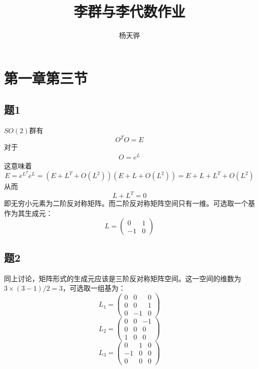 \documentclass{ctexart}
\title{李群与李代数作业}
\author{杨天骅}
\begin{document}
	\maketitle
	\tableofcontents
	
	\newpage
	
	\section{第一章第三节}
	
	\subsection{题1}
	
	$SO(2)$群有
	\begin{equation}
	O^TO=E
	\end{equation}
	对于
	\begin{eqnarray}
	O=e^{L}
	\end{eqnarray}
	这意味着
	\begin{equation}
	E=e^{L^T}e^{L}=(E+L^T+O(L^2))(E+L+O(L^2))=E+L+L^T+O(L^2)
	\end{equation}
	从而
	\begin{equation}
	L+L^T=0
	\end{equation}
	即无穷小元素为二阶反对称矩阵。而二阶反对称矩阵空间只有一维。可选取一个基作为其生成元：
	\begin{equation}
	L=\begin{pmatrix} 0 & 1 \\ -1 & 0 \end{pmatrix}
	\end{equation}
	
	\subsection{题2}
	
	同上讨论，矩阵形式的生成元应该是三阶反对称矩阵空间。这一空间的维数为$3\times (3-1)/2=3$，可选取一组基为：
	\begin{equation}
	L_1=\begin{pmatrix} 0 & 0 & 0 \\ 0 & 0 & 1 \\ 0 & -1 & 0 \end{pmatrix}
	\end{equation}
	\begin{equation}
	L_2=\begin{pmatrix} 0 & 0 & -1 \\ 0 & 0 & 0 \\ 1 & 0 & 0 \end{pmatrix}
	\end{equation}
	\begin{equation}
	L_3=\begin{pmatrix} 0 & 1 & 0 \\ -1 & 0 & 0 \\ 0 & 0 & 0 \end{pmatrix}
	\end{equation}
	
\end{document}
